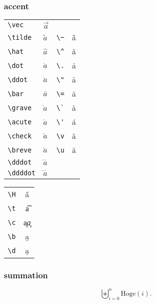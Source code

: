 \documentclass{jsarticle}
\begin{document}
\subsubsection{accent}

\begin{tabular}{ll||ll}
  \verb+\vec+ & $\vec{a}$\\
  \verb+\tilde+ & $\tilde{a}$ & \verb+\~+ & \~a\\
  \verb+\hat+ & $\hat{a}$     & \verb+\^+ & \^a\\
  \verb+\dot+ & $\dot{a}$     & \verb+\.+ & \.a\\
  \verb+\ddot+ & $\ddot{a}$   & \verb+\"+ & \"a\\
  \verb+\bar+ & $\bar{a}$     & \verb+\=+ & \=a\\
  \verb+\grave+ & $\grave{a}$ & \verb+\`+ & \`a\\
  \verb+\acute+ & $\acute{a}$ & \verb+\'+ & \'a\\
  \verb+\check+ & $\check{a}$ & \verb+\v+ & \v{a}\\
  \verb+\breve+ & $\breve{a}$ & \verb+\u+ & \u{a}\\
  \verb+\dddot+ & $\dddot{a}$\\
  \verb+\ddddot+ & $\ddddot{a}$\\
\end{tabular}

\begin{tabular}{c|c}
  \verb+\H+ & \H{a}\\
  \verb+\t+ & \t{a}\\
  \verb+\c+ & \c{a}\it\c{a}\\
  \verb+\b+ & \b{a}\\
  \verb+\d+ & \d{a}\\
\end{tabular}

\subsubsection{summation}
\[
  \biguplus_{i=0}^{n} \mathrm{Hoge}(i).
\]
\end{document}
